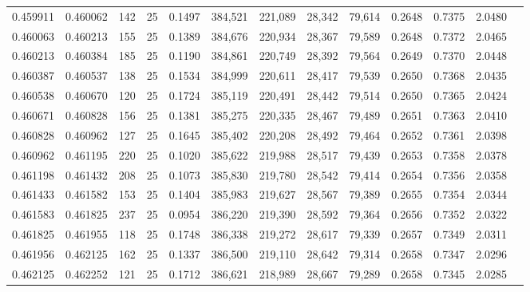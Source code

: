 \begin{tabular}{rrrrrrrrrrrrr}
0.459911 & 0.460062 &   142 &  25 &                                     0.1497 & 384,521 & 221,089 &  28,342 &  79,614 & 0.2648 & 0.7375 & 2.0480 \\
0.460063 & 0.460213 &   155 &  25 &                                     0.1389 & 384,676 & 220,934 &  28,367 &  79,589 & 0.2648 & 0.7372 & 2.0465 \\
0.460213 & 0.460384 &   185 &  25 &                                     0.1190 & 384,861 & 220,749 &  28,392 &  79,564 & 0.2649 & 0.7370 & 2.0448 \\
0.460387 & 0.460537 &   138 &  25 &                                     0.1534 & 384,999 & 220,611 &  28,417 &  79,539 & 0.2650 & 0.7368 & 2.0435 \\
0.460538 & 0.460670 &   120 &  25 &                                     0.1724 & 385,119 & 220,491 &  28,442 &  79,514 & 0.2650 & 0.7365 & 2.0424 \\
0.460671 & 0.460828 &   156 &  25 &                                     0.1381 & 385,275 & 220,335 &  28,467 &  79,489 & 0.2651 & 0.7363 & 2.0410 \\
0.460828 & 0.460962 &   127 &  25 &                                     0.1645 & 385,402 & 220,208 &  28,492 &  79,464 & 0.2652 & 0.7361 & 2.0398 \\
0.460962 & 0.461195 &   220 &  25 &                                     0.1020 & 385,622 & 219,988 &  28,517 &  79,439 & 0.2653 & 0.7358 & 2.0378 \\
0.461198 & 0.461432 &   208 &  25 &                                     0.1073 & 385,830 & 219,780 &  28,542 &  79,414 & 0.2654 & 0.7356 & 2.0358 \\
0.461433 & 0.461582 &   153 &  25 &                                     0.1404 & 385,983 & 219,627 &  28,567 &  79,389 & 0.2655 & 0.7354 & 2.0344 \\
0.461583 & 0.461825 &   237 &  25 &                                     0.0954 & 386,220 & 219,390 &  28,592 &  79,364 & 0.2656 & 0.7352 & 2.0322 \\
0.461825 & 0.461955 &   118 &  25 &                                     0.1748 & 386,338 & 219,272 &  28,617 &  79,339 & 0.2657 & 0.7349 & 2.0311 \\
0.461956 & 0.462125 &   162 &  25 &                                     0.1337 & 386,500 & 219,110 &  28,642 &  79,314 & 0.2658 & 0.7347 & 2.0296 \\
0.462125 & 0.462252 &   121 &  25 &                                     0.1712 & 386,621 & 218,989 &  28,667 &  79,289 & 0.2658 & 0.7345 & 2.0285 \\

\end{tabular}
